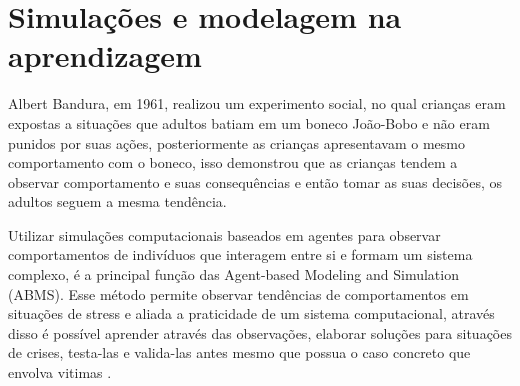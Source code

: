 \section{Simulações e modelagem na aprendizagem}

Albert Bandura, em 1961, realizou um experimento social, no qual crianças eram expostas a situações que adultos batiam em um boneco João-Bobo e não eram punidos por suas ações, posteriormente as crianças apresentavam o mesmo comportamento com o boneco, isso demonstrou que as crianças tendem a observar comportamento e suas consequências e então tomar as suas decisões, os adultos seguem a mesma tendência\cite{AlbertBandura}.

Utilizar simulações computacionais baseados em agentes para observar comportamentos de indivíduos que interagem entre si e formam um sistema complexo, é a principal função das Agent-based Modeling and Simulation (ABMS). Esse método permite observar tendências de comportamentos em situações de stress e aliada a praticidade de um sistema computacional, através disso é possível aprender através das observações, elaborar soluções para situações de crises, testa-las e valida-las antes mesmo que possua o caso concreto que envolva vitimas\cite{inproceedings} . 


